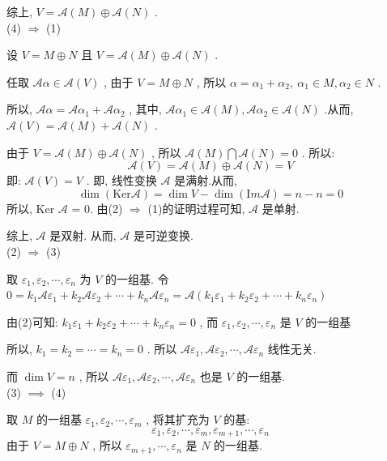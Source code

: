\documentclass[11pt,a4paper,openany,oneside]{book}
\newcommand{\Image}{\mathrm Im}
\begin{document}
综上,  $ V = \mathcal{A}(M) \oplus  \mathcal{A}(N) $ . \\ 

(4)  $ \Longrightarrow $  (1)

设 $ V = M \oplus  N $ 且 $ V = \mathcal{A}(M) \oplus  \mathcal{A}(N) $ .

任取 $ \mathcal{A}\alpha \in \mathcal{A}(V) $ , 由于 $ V = M \oplus  N $ , 所以 $ \alpha = \alpha_1 + \alpha_2, \ \alpha_1 \in M , \alpha_2 \in N  $ .

所以,  $ \mathcal{A}\alpha = \mathcal{A}\alpha_1 + \mathcal{A}\alpha_2 $ , 其中,  $ \mathcal{A}\alpha_1 \in \mathcal{A}(M), \mathcal{A}\alpha_2 \in \mathcal{A}(N) $ .从而,  $ \mathcal{A}(V) = \mathcal{A}(M) + \mathcal{A}(N) $ .

由于 $ V= \mathcal{A}(M) \oplus  \mathcal{A}(N)  $ , 所以 $ \mathcal{A}(M) \bigcap \mathcal{A}(N)=0 $ . 所以:
 $$  \mathcal{A}(V) = \mathcal{A}(M) \oplus  \mathcal{A}(N) = V $$ 
即: $ \mathcal{A}(V) = V $ . 即, 线性变换 $ \mathcal{A} $ 是满射.从而,
 $$  \dim ( \mathrm{Ker} \mathcal{A}) = \dim V - \dim ( \Image \mathcal{A}) = n - n = 0  $$ 
所以, Ker $ \mathcal{A} $  = {0}. 由(2) $ \Longrightarrow $ (1)的证明过程可知,  $ \mathcal{A} $ 是单射.

综上,  $ \mathcal{A} $ 是双射. 从而,  $ \mathcal{A} $ 是可逆变换.  \\

(2)  $ \Longrightarrow $  (3)

取 $ \varepsilon_1, \varepsilon_2, \cdots, \varepsilon_n $ 为 $ V $ 的一组基. 令 $  0 = k_1\mathcal{A}\varepsilon_1 + k_2\mathcal{A}\varepsilon_2 + \cdots + k_n\mathcal{A}\varepsilon_n = \mathcal{A}(k_1\varepsilon_1 + k_2\varepsilon_2 + \cdots + k_n\varepsilon_n)  $ 

由(2)可知:  $ k_1\varepsilon_1 + k_2\varepsilon_2 + \cdots + k_n\varepsilon_n = 0 $ , 而 $ \varepsilon_1, \varepsilon_2, \cdots, \varepsilon_n $ 是 $ V $ 的一组基

所以,  $ k_1 = k_2 = \cdots = k_n = 0 $ . 所以 $ \mathcal{A}\varepsilon_1, \mathcal{A}\varepsilon_2, \cdots, \mathcal{A}\varepsilon_n $ 线性无关.

而 $ \dim V = n $ , 所以 $ \mathcal{A}\varepsilon_1, \mathcal{A}\varepsilon_2, \cdots, \mathcal{A}\varepsilon_n $ 也是 $ V $ 的一组基.  \\ 

(3) $\implies$ (4) 

取 $ M $ 的一组基 $ \varepsilon_1, \varepsilon_2, \cdots, \varepsilon_m $ , 将其扩充为 $ V $ 的基:
 $$  \varepsilon_1, \varepsilon_2, \cdots, \varepsilon_m, \varepsilon_{m+1}, \cdots, \varepsilon_n  $$ 
由于 $  V = M \oplus  N $ , 所以 $ \varepsilon_{m+1}, \cdots, \varepsilon_n $ 是 $ N $ 的一组基.
\end{document}

